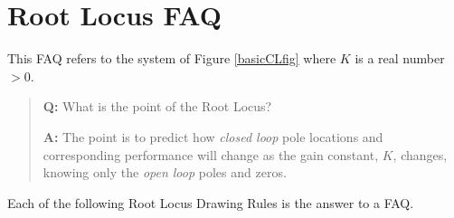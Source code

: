 




\section{Root Locus FAQ}

This FAQ refers to the system of Figure \ref{basicCLfig} where $K$ is a real
number $>0$.

\vspace{0.25in}
\begin{quotation}
{\bf Q:}  What is the point of the Root Locus?

{\bf A:}  The point is to predict how {\it closed loop} pole
locations  and  corresponding performance will change as the gain constant, $K$, changes,
knowing only the {\it open loop} poles and zeros.
\end{quotation}

\vspace{0.35in}	%



Each of the following Root Locus Drawing Rules is the answer to a FAQ.  

